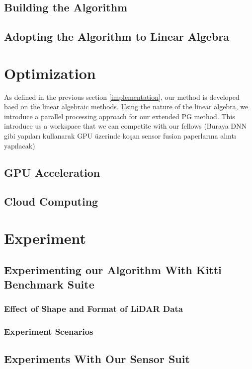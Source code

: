 \documentclass[conference]{IEEEtran}
\begin{document}
\subsection{Building the Algorithm}

\subsection{Adopting the Algorithm to Linear Algebra}

\section{Optimization}

As defined in the previous section \ref{implementation}, our method is developed baed on the linear algebraic methods. Using the nature of the linear algebra, we introduce a parallel processing approach for our extended PG method. This introduce us a workspace that we can competite with our fellows (Buraya DNN gibi yapıları kullanarak GPU üzerinde koşan sensor fusion paperlarına alıntı yapılacak)

\subsection{GPU Acceleration}
\subsection{Cloud Computing}

\section{Experiment}

\subsection{Experimenting our Algorithm With Kitti Benchmark Suite}

\subsubsection{Effect of Shape and Format of LiDAR Data}
\subsubsection{Experiment Scenarios}

\subsection{Experiments With Our Sensor Suit}
\end{document}
